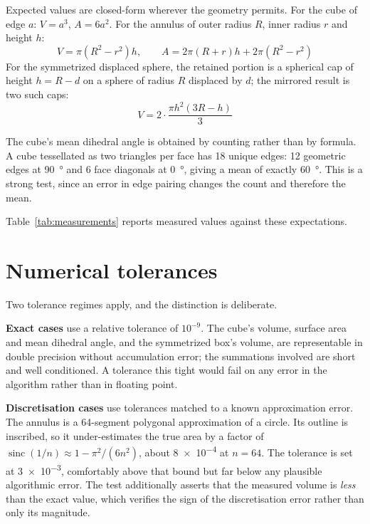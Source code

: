\documentclass[11pt, a4paper]{article}
\begin{document}
Expected values are closed-form wherever the geometry permits. For the cube of
edge $a$: $V = a^3$, $A = 6a^2$. For the annulus of outer radius $R$, inner
radius $r$ and height $h$:
%
\begin{equation}
  V = \pi \left( R^2 - r^2 \right) h,
  \qquad
  A = 2\pi \left( R + r \right) h + 2\pi \left( R^2 - r^2 \right)
\end{equation}
%
For the symmetrized displaced sphere, the retained portion is a spherical cap
of height $h = R - d$ on a sphere of radius $R$ displaced by $d$; the mirrored
result is two such caps:
%
\begin{equation}
  V = 2 \cdot \frac{\pi h^2 \left( 3R - h \right)}{3}
\end{equation}

The cube's mean dihedral angle is obtained by counting rather than by
formula. A cube tessellated as two triangles per face has 18 unique edges: 12
geometric edges at \qty{90}{\degree} and 6 face diagonals at
\qty{0}{\degree}, giving a mean of exactly \qty{60}{\degree}. This is a strong
test, since an error in edge pairing changes the count and therefore the mean.

Table~\ref{tab:measurements} reports measured values against these
expectations.

\begin{table}[h]
  \centering
  \small
  
  \caption{Measured values against analytical expectations. Relative error and
  the tolerance applied by the test suite are shown for each quantity.}
  \label{tab:measurements}
\end{table}

\section{Numerical tolerances}

Two tolerance regimes apply, and the distinction is deliberate.

\textbf{Exact cases} use a relative tolerance of $10^{-9}$. The cube's volume,
surface area and mean dihedral angle, and the symmetrized box's volume, are
representable in double precision without accumulation error; the summations
involved are short and well conditioned. A tolerance this tight would fail on
any error in the algorithm rather than in floating point.

\textbf{Discretisation cases} use tolerances matched to a known approximation
error. The annulus is a 64-segment polygonal approximation of a circle. Its
outline is inscribed, so it under-estimates the true area by a factor of
$\operatorname{sinc}(1/n) \approx 1 - \pi^2/(6n^2)$, about \num{8e-4} at
$n = 64$. The tolerance is set at \num{3e-3}, comfortably above that bound but
far below any plausible algorithmic error. The test additionally asserts that
the measured volume is \emph{less} than the exact value, which verifies the
sign of the discretisation error rather than only its magnitude.
\end{document}
